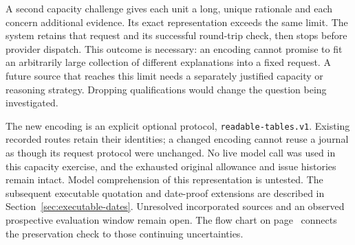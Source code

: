 A second capacity challenge gives each unit a long, unique rationale and each
concern additional evidence. Its exact representation exceeds the same limit.
The system retains that request and its successful round-trip check, then stops
before provider dispatch. This outcome is necessary: an encoding cannot promise
to fit an arbitrarily large collection of different explanations into a fixed
request. A future source that reaches this limit needs a separately justified
capacity or reasoning strategy. Dropping qualifications would change the
question being investigated.

The new encoding is an explicit optional protocol,
\texttt{readable-tables.v1}. Existing recorded routes retain their identities;
a changed encoding cannot reuse a journal as though its request protocol were
unchanged. No live model call was used in this capacity exercise, and the
exhausted original allowance and issue histories remain intact. Model
comprehension of this representation is untested. The subsequent executable
quotation and date-proof extensions are described in
Section~\ref{sec:executable-dates}. Unresolved incorporated sources and an
observed prospective evaluation window remain open.
The flow chart on page~\pageref{map:lossless-context} connects the preservation
check to those continuing uncertainties.
